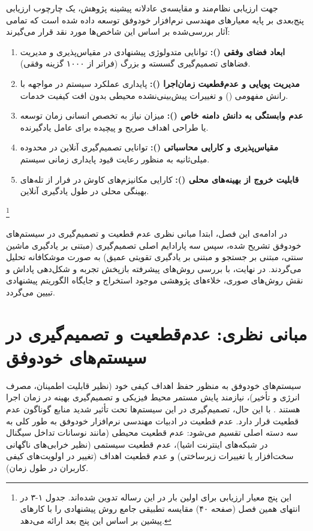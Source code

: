 \documentclass[oneside,openany,phd]{TMU-Thesis}
\begin{document}
جهت ارزیابی نظام‌مند و مقایسه‌ی عادلانه پیشینه پژوهش، یک چارچوب ارزیابی پنج‌بعدی بر پایه معیارهای مهندسی نرم‌افزار خودوفق \cite{cheng2009software, weyns2012formal} توسعه داده شده است که تمامی آثار بررسی‌شده بر اساس این شاخص‌ها مورد نقد قرار می‌گیرند:
\begin{enumerate}
    \item \textbf{ابعاد فضای وفقی ():} توانایی متدولوژی پیشنهادی در مقیاس‌پذیری و مدیریت فضاهای تصمیم‌گیری گسسته و بزرگ (فراتر از ۱۰۰۰ گزینه وفقی).
    \item \textbf{مدیریت پویایی و عدم‌قطعیت زمان‌اجرا ():} پایداری عملکرد سیستم در مواجهه با رانش مفهومی () و تغییرات پیش‌بینی‌نشده محیطی بدون افت کیفیت خدمات.
    \item \textbf{عدم وابستگی به دانش دامنه خاص ():} میزان نیاز به تخصص انسانی زمان توسعه یا طراحی اهداف صریح و پیچیده برای عامل یادگیرنده.
    \item \textbf{مقیاس‌پذیری و کارایی محاسباتی ():} توانایی تصمیم‌گیری آنلاین در محدوده میلی‌ثانیه به منظور رعایت قیود پایداری زمانی سیستم.
    \item \textbf{قابلیت خروج از بهینه‌های محلی ():} کارایی مکانیزم‌های کاوش در فرار از تله‌های بهینگی محلی در طول یادگیری آنلاین.
\end{enumerate}\footnote{این پنج معیار ارزیابی برای اولین بار در این رساله تدوین شده‌اند. جدول ۱-۳ در انتهای همین فصل (صفحه ۴۰) مقایسه تطبیقی جامع روش پیشنهادی  را با کارهای پیشین بر اساس این پنج بعد ارائه می‌دهد.}

در ادامه‌ی این فصل، ابتدا مبانی نظری عدم قطعیت و تصمیم‌گیری در سیستم‌های خودوفق تشریح شده، سپس سه پارادایم اصلی تصمیم‌گیری (مبتنی بر یادگیری ماشین سنتی، مبتنی بر جستجو و مبتنی بر یادگیری تقویتی عمیق) به صورت موشکافانه تحلیل می‌گردند. در نهایت، با بررسی روش‌های پیشرفته بازپخش تجربه و شکل‌دهی پاداش و نقش روش‌های صوری، خلاءهای پژوهشی موجود استخراج و جایگاه الگوریتم پیشنهادی  تبیین می‌گردد.

\section{مبانی نظری: عدم‌قطعیت و تصمیم‌گیری در سیستم‌های خودوفق}
\label{sec:ch3_foundations}

سیستم‌های خودوفق به منظور حفظ اهداف کیفی خود (نظیر قابلیت اطمینان، مصرف انرژی و تأخیر)، نیازمند پایش مستمر محیط فیزیکی و تصمیم‌گیری بهینه در زمان اجرا هستند \cite{kephart2003vision, cheng2009software}. با این حال، تصمیم‌گیری در این سیستم‌ها تحت تأثیر شدید منابع گوناگون عدم قطعیت قرار دارد. عدم قطعیت در ادبیات مهندسی نرم‌افزار خودوفق \cite{cheng2009software, esfahani2013uncertainty} به طور کلی به سه دسته اصلی تقسیم می‌شود: عدم قطعیت محیطی (مانند نوسانات تداخل سیگنال در شبکه‌های اینترنت اشیا)، عدم قطعیت سیستمی (نظیر خرابی‌های ناگهانی سخت‌افزار یا تغییرات زیرساختی) و عدم قطعیت اهداف (تغییر در اولویت‌های کیفی کاربران در طول زمان).
\end{document}
